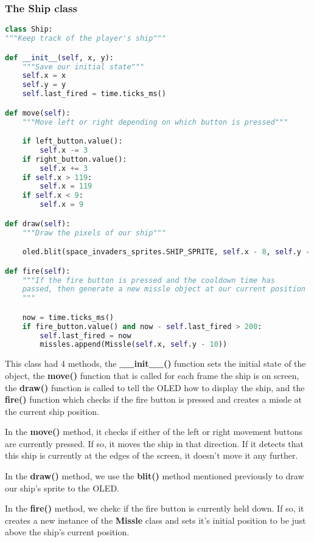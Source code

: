\subsubsection{The Ship class}
\begin{lstlisting}[language=Python,caption=The Ship class]
class Ship:
"""Keep track of the player's ship"""

def __init__(self, x, y):
    """Save our initial state"""
    self.x = x
    self.y = y
    self.last_fired = time.ticks_ms()

def move(self):
    """Move left or right depending on which button is pressed"""

    if left_button.value():
        self.x -= 3
    if right_button.value():
        self.x += 3
    if self.x > 119:
        self.x = 119
    if self.x < 9:
        self.x = 9

def draw(self):
    """Draw the pixels of our ship"""

    oled.blit(space_invaders_sprites.SHIP_SPRITE, self.x - 8, self.y - 5)

def fire(self):
    """If the fire button is pressed and the cooldown time has
    passed, then generate a new missle object at our current position
    """

    now = time.ticks_ms()
    if fire_button.value() and now - self.last_fired > 200:
        self.last_fired = now
        missles.append(Missle(self.x, self.y - 10))
\end{lstlisting}

This class had 4 methods, the \textbf{\_\_init\_\_()} function sets the initial state of the object,
the \textbf{move()} function that is called for each frame the ship is on screen, the \textbf{draw()}
function is called to tell the OLED how to display the ship, and the \textbf{fire()} function which
checks if the fire button is pressed and creates a missle at the current ship position.

In the \textbf{move()} method, it checks if either of the left or right movement buttons are currently
pressed. If so, it moves the ship in that direction. If it detects that this ship is currently at the
edges of the screen, it doesn't move it any further.

In the \textbf{draw()} method, we use the \textbf{blit()} method mentioned previously to draw our ship's sprite to the OLED.

In the \textbf{fire()} method, we chekc if the fire button is currently held down. If so, it creates a new
instance of the \textbf{Missle} class and sets it's initial position to be just above the ship's current position.

